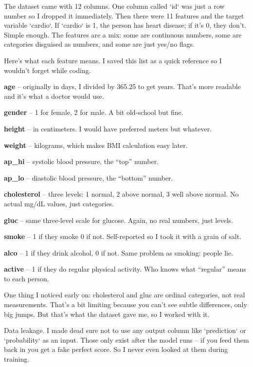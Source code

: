 \documentclass[12pt, a4paper, oneside]{book}
\begin{document}
The dataset came with 12 columns. One column called `id` was just a row number so I dropped it immediately. Then there were 11 features and the target variable `cardio`. If `cardio` is 1, the person has heart disease; if it's 0, they don't. Simple enough. The features are a mix: some are continuous numbers, some are categories disguised as numbers, and some are just yes/no flags.

Here's what each feature means. I saved this list as a quick reference so I wouldn't forget while coding.

\textbf{age} -- originally in days, I divided by 365.25 to get years. That's more readable and it's what a doctor would use.

\textbf{gender} -- 1 for female, 2 for male. A bit old-school but fine.

\textbf{height} -- in centimeters. I would have preferred meters but whatever.

\textbf{weight} -- kilograms, which makes BMI calculation easy later.

\textbf{ap\_hi} -- systolic blood pressure, the ``top'' number.

\textbf{ap\_lo} -- diastolic blood pressure, the ``bottom'' number.

\textbf{cholesterol} -- three levels: 1 normal, 2 above normal, 3 well above normal. No actual mg/dL values, just categories.

\textbf{gluc} -- same three-level scale for glucose. Again, no real numbers, just levels.

\textbf{smoke} -- 1 if they smoke 0 if not. Self-reported so I took it with a grain of salt.

\textbf{alco} -- 1 if they drink alcohol, 0 if not. Same problem as smoking: people lie.

\textbf{active} -- 1 if they do regular physical activity. Who knows what ``regular'' means to each person.

One thing I noticed early on: cholesterol and gluc are ordinal categories, not real measurements. That's a bit limiting because you can't see subtle differences, only big jumps. But that's what the dataset gave me, so I worked with it.

\begin{keyinsight}
Data leakage. I made dead sure not to use any output column like `prediction` or `probability` as an input. Those only exist after the model runs -- if you feed them back in you get a fake perfect score. So I never even looked at them during training.
\end{keyinsight}
\end{document}
